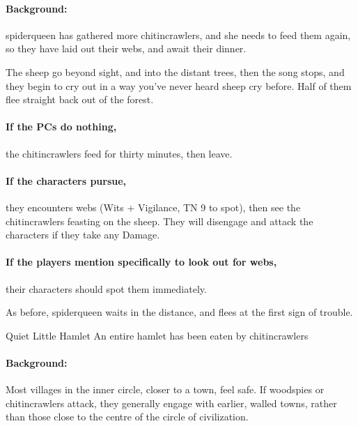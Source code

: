 \begin{multicols}{2}
\begin{boxtext}
\end{boxtext}

\paragraph{Background:}
\Gls{spiderqueen} has gathered more chitincrawlers, and she needs to feed them again, so they have laid out their webs, and await their dinner.

\begin{boxtext}

  The sheep go beyond sight, and into the distant trees, then the song stops, and they begin to cry out in a way you've never heard sheep cry before.  Half of them flee straight back out of the forest.

\end{boxtext}

\paragraph{If the PCs do nothing,}
the chitincrawlers feed for thirty minutes, then leave.

\paragraph{If the characters pursue,}
they encounters webs (Wits + Vigilance, TN 9 to spot), then see the chitincrawlers feasting on the sheep.
They will disengage and attack the characters if they take any Damage.

\paragraph{If the players mention specifically to look out for webs,}
their characters should spot them immediately.

As before, \gls{spiderqueen} waits in the distance, and flees at the first sign of trouble.


{Quiet Little Hamlet}%
{An entire hamlet has been eaten by chitincrawlers}%


\paragraph{Background:}
Most villages in the inner circle, closer to a town, feel safe.
If woodspies or chitincrawlers attack, they generally engage with earlier, walled towns, rather than those close to the centre of the circle of civilization.


\end{multicols}
